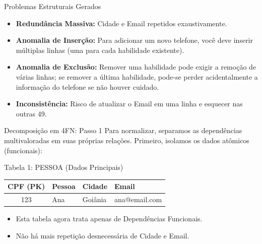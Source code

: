 \documentclass[9pt]{beamer}
\begin{document}
\begin{frame}{Problemas Estruturais Gerados}
  \begin{itemize}
    \item \textbf{Redundância Massiva:} Cidade e Email repetidos exaustivamente.
    \item \textbf{Anomalia de Inserção:} Para adicionar um novo telefone, você deve inserir múltiplas linhas (uma para cada habilidade existente).
    \item \textbf{Anomalia de Exclusão:} Remover uma habilidade pode exigir a remoção de várias linhas; se remover a última habilidade, pode-se perder acidentalmente a informação do telefone se não houver cuidado.
    \item \textbf{Inconsistência:} Risco de atualizar o Email em uma linha e esquecer nas outras 49.
  \end{itemize}
\end{frame}

\begin{frame}{Decomposição em 4FN: Passo 1}
  \small
  Para normalizar, separamos as dependências multivaloradas em suas próprias relações.
  Primeiro, isolamos os dados atômicos (funcionais):
  \vspace{0.4cm}
  \begin{exampleblock}{Tabela 1: PESSOA (Dados Principais)}
    \centering
    \begin{tabular}{|c|l|l|l|}
      \hline
      \textbf{CPF (PK)} & \textbf{Pessoa} & \textbf{Cidade} & \textbf{Email} \\ \hline
      123 & Ana & Goiânia & ana@email.com \\ \hline
    \end{tabular}
  \end{exampleblock}
  \vspace{0.4cm}
  \begin{itemize}
    \item Esta tabela agora trata apenas de Dependências Funcionais.
    \item Não há mais repetição desnecessária de Cidade e Email.
  \end{itemize}
\end{frame}
\end{document}
